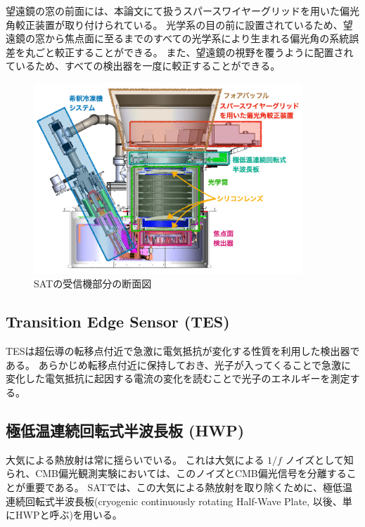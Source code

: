 \documentclass[../../main.tex]{subfiles}
\begin{document}
望遠鏡の窓の前面には、本論文にて扱うスパースワイヤーグリッドを用いた偏光角較正装置が取り付けられている。
光学系の目の前に設置されているため、望遠鏡の窓から焦点面に至るまでのすべての光学系により生まれる偏光角の系統誤差を丸ごと較正することができる。
また、望遠鏡の視野を覆うように配置されているため、すべての検出器を一度に較正することができる。
\begin{figure}[H]
    \centering
    \includegraphics[width=0.9\textwidth]{simons_observatory/sat_danmen.pdf}
    \caption{SATの受信機部分の断面図}
    \label{fig:so-sat}
\end{figure}

\subsection{Transition Edge Sensor (TES)}
TESは超伝導の転移点付近で急激に電気抵抗が変化する性質を利用した検出器である。
あらかじめ転移点付近に保持しておき、光子が入ってくることで急激に変化した電気抵抗に起因する電流の変化を読むことで光子のエネルギーを測定する。

\subsection{極低温連続回転式半波長板 (HWP)}
\label{sec:HWP}
大気による熱放射は常に揺らいでいる。
これは大気による $1/f$ ノイズとして知られ、CMB偏光観測実験においては、このノイズとCMB偏光信号を分離することが重要である。
SATでは、この大気による熱放射を取り除くために、極低温連続回転式半波長板(cryogenic continuously rotating Half-Wave Plate, 以後、単にHWPと呼ぶ)を用いる。\cite{so:hwp_yamada}
\end{document}
